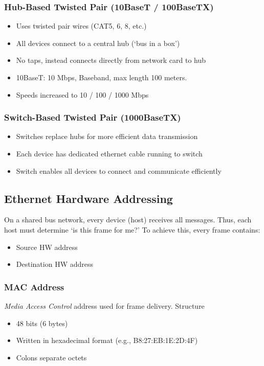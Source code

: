 \documentclass{article}
\begin{document}
\subsubsection*{Hub-Based Twisted Pair (10BaseT / 100BaseTX)}
\begin{itemize}
    \item Uses twisted pair wires (CAT5, 6, 8, etc.)
    \item All devices connect to a central hub (`bus in a box')
    \item No taps, instead connects directly from network card to hub
    \item 10BaseT: 10 Mbps, Baseband, max length 100 meters.
    \item Speeds increased to 10 / 100 / 1000 Mbps
\end{itemize}

\subsubsection*{Switch-Based Twisted Pair (1000BaseTX)}
\begin{itemize}
    \item Switches replace hubs for more efficient data transmission
    \item Each device has dedicated ethernet cable running to switch
    \item Switch enables all devices to connect and communicate efficiently
\end{itemize}

\subsection*{Ethernet Hardware Addressing}
On a shared bus network, every device (host) receives all messages.
Thus, each host must determine `is this frame for me?'
To achieve this, every frame contains:
\begin{itemize}
    \item Source HW address
    \item Destination HW address
\end{itemize}

\subsubsection*{MAC Address}
\emph{Media Access Control} address used for frame delivery.
Structure
\begin{itemize}
    \item 48 bits (6 bytes)
    \item Written in hexadecimal format (e.g., B8:27:EB:1E:2D:4F)
    \item Colons separate octets
\end{itemize}
\end{document}
